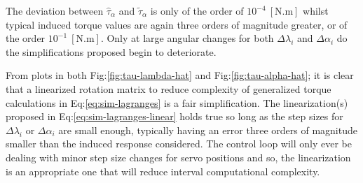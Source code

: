 \par
The deviation between $\hat{\tau}_\alpha$ and $\tilde{\tau}_\alpha$ is only of the order of $10^{-4}~[\text{N.m}]$ whilst typical induced torque values are again three orders of magnitude greater, or of the order $10^{-1}~[\text{N.m}]$. Only at large angular changes for both $\Delta\lambda_i$ and $\Delta\alpha_i$ do the simplifications proposed begin to deteriorate.
\par
From plots in both Fig:\ref{fig:tau-lambda-hat} and Fig:\ref{fig:tau-alpha-hat}; it is clear that a linearized rotation matrix to reduce complexity of generalized torque calculations in Eq:\ref{eq:sim-lagranges} is a fair simplification. The linearization(s) proposed in Eq:\ref{eq:sim-lagranges-linear} holds true so long as the step sizes for $\Delta\lambda_i$ or $\Delta\alpha_i$ are small enough, typically having an error three orders of magnitude smaller than the induced response considered. The control loop will only ever be dealing with minor step size changes for servo positions and so, the linearization is an appropriate one that will reduce interval computational complexity.
